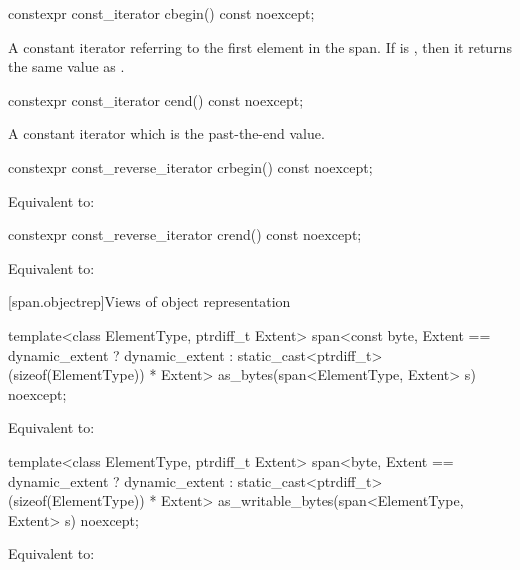 \begin{codeblock}
\begin{codeblock}
\begin{codeblock}
%
\begin{itemdecl}
constexpr const_iterator cbegin() const noexcept;
\end{itemdecl}
\begin{itemdescr}
\pnum
\returns
A constant iterator referring to the first element in the span.
If  is , then it returns the same value
as .
\end{itemdescr}

%
\begin{itemdecl}
constexpr const_iterator cend() const noexcept;
\end{itemdecl}
\begin{itemdescr}
\pnum
\returns
A constant iterator which is the past-the-end value.
\end{itemdescr}

%
\begin{itemdecl}
constexpr const_reverse_iterator crbegin() const noexcept;
\end{itemdecl}
\begin{itemdescr}
\pnum
\effects
Equivalent to: 
\end{itemdescr}

%
\begin{itemdecl}
constexpr const_reverse_iterator crend() const noexcept;
\end{itemdecl}
\begin{itemdescr}
\pnum
\effects
Equivalent to: 
\end{itemdescr}


[span.objectrep]{Views of object representation}

%
\begin{itemdecl}
template<class ElementType, ptrdiff_t Extent>
  span<const byte,
       Extent == dynamic_extent ? dynamic_extent
                                : static_cast<ptrdiff_t>(sizeof(ElementType)) * Extent>
    as_bytes(span<ElementType, Extent> s) noexcept;
\end{itemdecl}
\begin{itemdescr}
\pnum
\effects
Equivalent to: 
\end{itemdescr}

%
\begin{itemdecl}
template<class ElementType, ptrdiff_t Extent>
  span<byte,
       Extent == dynamic_extent ? dynamic_extent
                                : static_cast<ptrdiff_t>(sizeof(ElementType)) * Extent>
    as_writable_bytes(span<ElementType, Extent> s) noexcept;
\end{itemdecl}
\begin{itemdescr}
\pnum
\effects
Equivalent to: 


\end{itemdescr}
\end{codeblock}
\end{codeblock}
\end{codeblock}
